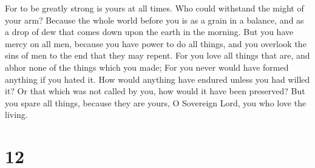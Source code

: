 For to be greatly strong is yours at all times. Who
could withstand the might of your arm?  Because the whole
world before you is as a grain in a balance, and as a drop of dew that
comes down upon the earth in the morning.  But you have
mercy on all men, because you have power to do all things, and you
overlook the sins of men to the end that they may repent.
 For you love all things that are, and abhor none of the
things which you made; For you never would have formed anything if you
hated it.  How would anything have endured unless you had
willed it? Or that which was not called by you, how would it have been
preserved?  But you spare all things, because they are
yours, O Sovereign Lord, you who love the living.

\hypertarget{section-11}{%
\section{12}\label{section-11}}

